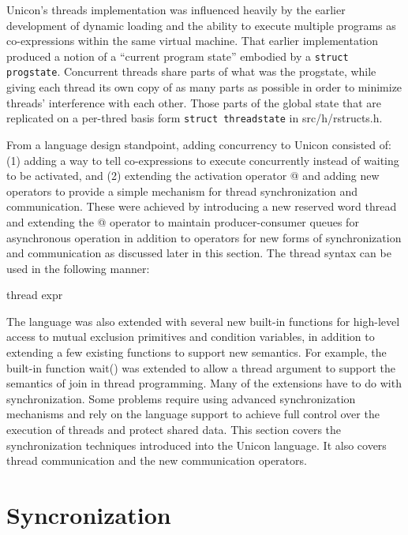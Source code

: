 Unicon's threads implementation was influenced heavily by the
earlier development of dynamic loading and the ability to execute
multiple programs as co-expressions within the same virtual machine.
That earlier implementation produced a notion of a ``current program
state'' embodied by a \texttt{struct progstate}. Concurrent threads
share parts of what was the progstate, while giving each thread its
own copy of as many parts as possible in order to minimize threads'
interference with each other.  Those parts of the global state that
are replicated on a per-thred basis form \texttt{struct threadstate}
in src/h/rstructs.h.

From a language design standpoint, adding concurrency to Unicon consisted of:
(1) adding a way to tell co-expressions to execute concurrently instead of
waiting to be activated, and (2) extending the activation operator @ and
adding new operators to provide a simple mechanism for thread synchronization
and communication. These were achieved by introducing a new reserved word thread
and extending the @ operator to maintain producer-consumer queues for asynchronous
operation in addition to operators for new forms of synchronization and
communication as discussed later in this section. The thread syntax can be used
in the following manner:

\begin{iconcode}
thread expr
\end{iconcode}

The language was also extended with several new built-in functions for
high-level access to mutual exclusion primitives and condition variables,
in addition to extending a few existing functions to support new semantics.
For example, the built-in function wait() was extended to allow a thread argument
to support the semantics of join in thread programming. Many of the extensions
have to do with synchronization. Some problems require using advanced synchronization
mechanisms and rely on the language support to achieve full control over the execution
of threads and protect shared data. This section covers the synchronization techniques
introduced into the Unicon language. It also covers thread communication and the new
communication operators. 

\section{Syncronization}
